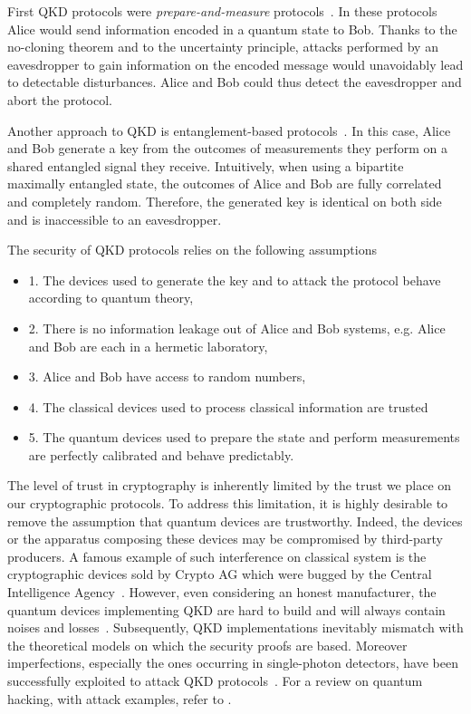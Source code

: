 First \acrshort{QKD} protocols were \textit{prepare-and-measure} protocols~\cite{Bennett84,Grosshans2002,Grosshans2003}.
In these protocols Alice would send information encoded in a quantum state to Bob.
Thanks to the no-cloning theorem and to the uncertainty principle, attacks performed by an eavesdropper to gain information on the encoded message would unavoidably lead to detectable disturbances.
Alice and Bob could thus detect the eavesdropper and abort the protocol.

Another approach to \acrshort{QKD} is entanglement-based protocols~\cite{Ekert1991}.
In this case, Alice and Bob generate a key from the outcomes of  measurements they perform on a shared entangled signal they receive.
Intuitively, when using a bipartite maximally entangled state, the outcomes of Alice and Bob are fully correlated and completely random.
Therefore, the generated key is identical on both side and is inaccessible to an eavesdropper.

\medbreak

The security of QKD protocols relies on the following assumptions
\begin{itemize}
	\item 1. The devices used to generate the key and to attack the protocol behave according to quantum theory,
	\item 2. There is no information leakage out of Alice and Bob systems, e.g. Alice and Bob are each in a hermetic laboratory,
	\item 3. Alice and Bob have access to random numbers,
	\item 4. The classical devices used to process classical information are trusted 
	\item 5. The quantum devices used to prepare the state and perform measurements are perfectly calibrated and behave predictably.
\end{itemize}

The level of trust in cryptography is inherently limited by the trust we place on our cryptographic protocols. 
To address this limitation, it is highly desirable to remove the assumption that quantum devices are trustworthy.
Indeed, the devices or the apparatus composing these devices may be compromised by third-party producers.
A famous example of such interference on classical system is the cryptographic devices sold by Crypto AG which were bugged by the Central Intelligence Agency~\cite{Miller2020}.
However, even considering an honest manufacturer, the quantum devices implementing QKD are hard to build and will always contain noises and losses~\cite{Diamanti2016,Xu2020}.
Subsequently, QKD implementations inevitably mismatch with the theoretical models on which the security proofs are based. 
Moreover imperfections, especially the ones occurring in single-photon detectors, have been successfully exploited to attack QKD protocols~\cite{Fung2007,Lydersen2010,Gerhardt2011,Weier2011}. 
For a review on quantum hacking, with attack examples, refer to \cite{Lo2014}.

